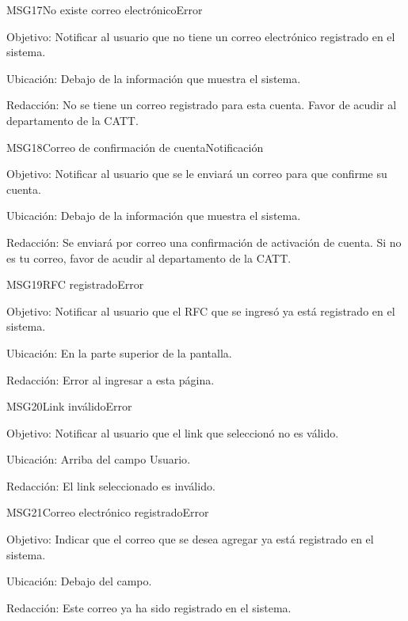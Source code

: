 \begin{mensaje}{MSG17}{No existe correo electrónico}{Error}
	\item[Objetivo:] Notificar al usuario que no tiene un correo electrónico registrado en el sistema.
	\item[Ubicación:] Debajo de la información que muestra el sistema.
	\item[Redacción:] No se tiene un correo registrado para esta cuenta. Favor de acudir al departamento de la CATT.
\end{mensaje}

\begin{mensaje}{MSG18}{Correo de confirmación de cuenta}{Notificación}
	\item[Objetivo:] Notificar al usuario que se le enviará un correo para que confirme su cuenta.
	\item[Ubicación:] Debajo de la información que muestra el sistema.
	\item[Redacción:] Se enviará por correo una confirmación de activación de cuenta. Si no es tu correo, favor de acudir al departamento de la CATT.
\end{mensaje}

\begin{mensaje}{MSG19}{RFC registrado}{Error}
	\item[Objetivo:] Notificar al usuario que el RFC que se ingresó ya está registrado en el sistema.
    \item[Ubicación:] En la parte superior de la pantalla.
    \item[Redacción:] Error al ingresar a esta página.
\end{mensaje}

\begin{mensaje}{MSG20}{Link inválido}{Error}
	\item[Objetivo:] Notificar al usuario que el link que seleccionó no es válido.
	\item[Ubicación:] Arriba del campo {Usuario}.
	\item[Redacción:] El link seleccionado es inválido. 
\end{mensaje}

\begin{mensaje}{MSG21}{Correo electrónico registrado}{Error}
	\item[Objetivo:] Indicar que el correo que se desea agregar ya está registrado en el sistema.
    \item[Ubicación:] Debajo del campo.
    \item[Redacción:] Este correo ya ha sido registrado en el sistema.
\end{mensaje}


